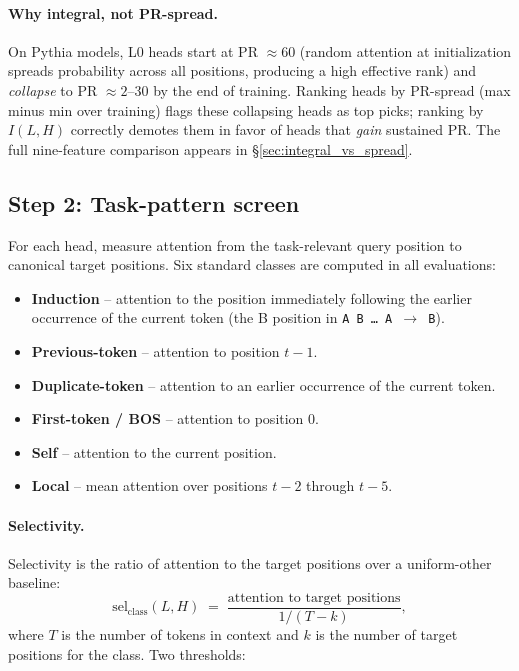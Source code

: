 \documentclass[11pt]{article}
\begin{document}
\paragraph{Why integral, not PR-spread.} On Pythia models, L0 heads start at PR $\approx 60$ (random attention at initialization spreads probability across all positions, producing a high effective rank) and \emph{collapse} to PR $\approx 2$--$30$ by the end of training. Ranking heads by PR-spread (max minus min over training) flags these collapsing heads as top picks; ranking by $I(L,H)$ correctly demotes them in favor of heads that \emph{gain} sustained PR. The full nine-feature comparison appears in \S\ref{sec:integral_vs_spread}.

\subsection{Step 2: Task-pattern screen}
\label{sec:step2}

For each head, measure attention from the task-relevant query position to canonical target positions. Six standard classes are computed in all evaluations:

\begin{itemize}[leftmargin=*,topsep=2pt,itemsep=2pt]
\item \textbf{Induction} -- attention to the position immediately following the earlier occurrence of the current token (the B position in \texttt{A B \dots\ A $\to$ B}).
\item \textbf{Previous-token} -- attention to position $t-1$.
\item \textbf{Duplicate-token} -- attention to an earlier occurrence of the current token.
\item \textbf{First-token / BOS} -- attention to position 0.
\item \textbf{Self} -- attention to the current position.
\item \textbf{Local} -- mean attention over positions $t-2$ through $t-5$.
\end{itemize}

\paragraph{Selectivity.} Selectivity is the ratio of attention to the target positions over a uniform-other baseline:
\begin{equation}
\mathrm{sel}_{\mathrm{class}}(L,H) \;=\; \frac{\text{attention to target positions}}{1/(T - k)},
\end{equation}
where $T$ is the number of tokens in context and $k$ is the number of target positions for the class. Two thresholds:
\end{document}

